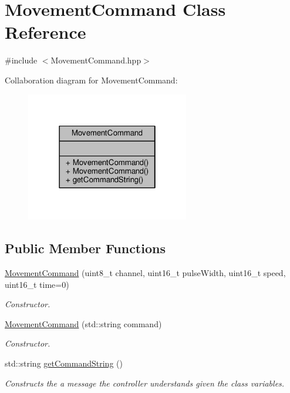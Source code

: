 \hypertarget{class_movement_command}{}\section{Movement\+Command Class Reference}
\label{class_movement_command}


{\ttfamily \#include $<$Movement\+Command.\+hpp$>$}



Collaboration diagram for Movement\+Command\+:
\nopagebreak
\begin{figure}[H]
\begin{center}
\leavevmode
\includegraphics[width=202pt]{class_movement_command__coll__graph}
\end{center}
\end{figure}
\subsection*{Public Member Functions}
\begin{DoxyCompactItemize}
\item 
\hyperlink{class_movement_command_a23e01529fc28c324c05f71641e0fd0b5}{Movement\+Command} (uint8\+\_\+t channel, uint16\+\_\+t pulse\+Width, uint16\+\_\+t speed, uint16\+\_\+t time=0)
\begin{DoxyCompactList}\small\item\em Constructor. \end{DoxyCompactList}\item 
\hyperlink{class_movement_command_aa8b1442fc7cc7fcb50ff9a7d921d859b}{Movement\+Command} (std\+::string command)
\begin{DoxyCompactList}\small\item\em Constructor. \end{DoxyCompactList}\item 
std\+::string \hyperlink{class_movement_command_a93ad4b1cce1cb177c320e1b95170bc5c}{get\+Command\+String} ()
\begin{DoxyCompactList}\small\item\em Constructs the a message the controller understands given the class variables. \end{DoxyCompactList}\end{DoxyCompactItemize}


